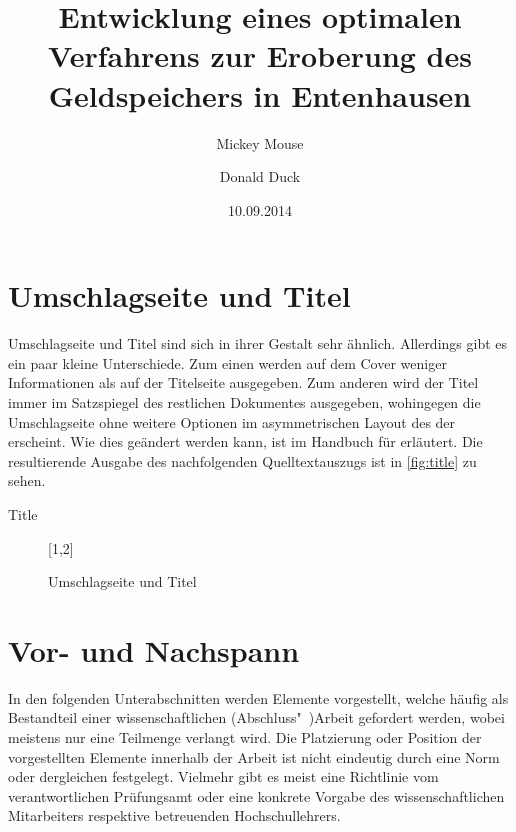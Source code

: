 \documentclass[%
  english,ngerman,%
  geometry=no,DIV=12,automark,%
]{tudscrartcl}
\begin{document}
\section{Umschlagseite und Titel}
Umschlagseite und Titel sind sich in ihrer Gestalt sehr ähnlich. Allerdings 
gibt es ein paar kleine Unterschiede. Zum einen werden auf dem Cover weniger 
Informationen als auf der Titelseite ausgegeben. Zum anderen wird der Titel 
immer im Satzspiegel des restlichen Dokumentes ausgegeben, wohingegen die 
Umschlagseite ohne weitere Optionen im asymmetrischen Layout des \CDs der \TnUD 
erscheint. Wie dies geändert werden kann, ist im Handbuch für  
erläutert. Die resultierende Ausgabe des nachfolgenden Quelltextauszugs ist in 
\autoref{fig:title} zu sehen.
%
\begin{Tutorial!}{Title}
\title{%
  Entwicklung eines optimalen Verfahrens zur Eroberung des
  Geldspeichers in Entenhausen
}
\author{%
  Mickey Mouse
  \and%
  Donald Duck
}
\date{10.09.2014}
\makecover
\maketitle
\end{Tutorial!}
%
\begin{figure}
[1,2]
\caption{Umschlagseite und Titel}
\label{fig:title}
\end{figure}



\section{Vor- und Nachspann}
In den folgenden Unterabschnitten werden Elemente vorgestellt, welche häufig 
als Bestandteil einer wissenschaftlichen (Abschluss"~)Arbeit gefordert werden, 
wobei meistens nur eine Teilmenge verlangt wird. Die Platzierung oder Position 
der vorgestellten Elemente innerhalb der Arbeit ist nicht eindeutig durch eine 
Norm oder dergleichen festgelegt. Vielmehr gibt es meist eine Richtlinie vom 
verantwortlichen Prüfungsamt oder eine konkrete Vorgabe des wissenschaftlichen 
Mitarbeiters respektive betreuenden Hochschullehrers.
\end{document}
